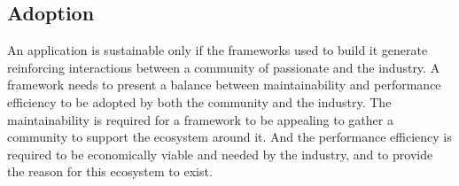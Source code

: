 










\subsection{Adoption}

An application is sustainable only if the frameworks used to build it generate reinforcing interactions between a community of passionate and the industry.
A framework needs to present a balance between maintainability and performance efficiency to be adopted by both the community and the industry.
The maintainability is required for a framework to be appealing to gather a community to support the ecosystem around it.
And the performance efficiency is required to be economically viable and needed by the industry, and to provide the reason for this ecosystem to exist.

